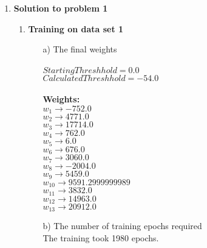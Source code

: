 \begin{enumerate}

	\item {\bf Solution to problem 1}
	
		\begin{enumerate}
			\item{\bf Training on data set 1}
				\begin{enumerate}
					\item[a)] The final weights \\ \\
						\(Starting Threshhold = 0.0\) \\
						\(Calculated Threshhold = -54.0\) \\ \\
						\bf Weights: \\
						\( w_{1} \rightarrow -752.0 \) \\
						\( w_{2} \rightarrow 4771.0 \) \\
						\( w_{3} \rightarrow 17714.0 \) \\
						\( w_{4} \rightarrow 762.0 \) \\
						\( w_{5} \rightarrow 6.0 \) \\
						\( w_{6} \rightarrow 676.0 \) \\
						\( w_{7} \rightarrow 3060.0 \) \\
						\( w_{8} \rightarrow -2004.0 \) \\
						\( w_{9} \rightarrow 5459.0 \) \\
						\( w_{10} \rightarrow 9591.2999999989 \) \\
						\( w_{11} \rightarrow 3832.0 \) \\
						\( w_{12} \rightarrow 14963.0 \) \\
						\( w_{13} \rightarrow 20912.0 \) \\
						
					\item[b)] The number of training epochs required \\
						\textnormal{The training took 1980 epochs.} \\
					

\end{enumerate}
\end{enumerate}
\end{enumerate}

